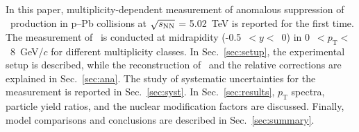 In this paper, multiplicity-dependent measurement of anomalous suppression of \fzero~production in p--Pb collisions at $\sqrt{s_{\rm NN}}$ = 5.02~TeV is reported for the first time. The measurement of \fzero~is conducted at midrapidity (-0.5~$<y<$~0) in 0~$<p_{\mathrm{T}}<$~8~GeV/$c$ for different multiplicity classes. In Sec.~\ref{sec:setup}, the experimental setup is described, while the reconstruction of \fzero\ and the relative corrections are explained in Sec.~\ref{sec:ana}. The study of systematic uncertainties for the measurement is reported in Sec.~\ref{sec:syst}. In Sec.~\ref{sec:results}, $p_{\mathrm{T}}$ spectra, particle yield ratios, and the nuclear modification factors are discussed. Finally, model comparisons and conclusions are described in Sec.~\ref{sec:summary}.

\label{sec:intro}



